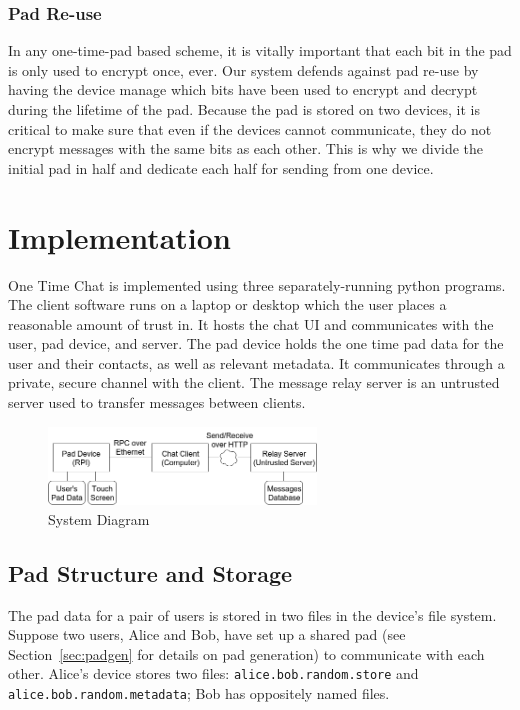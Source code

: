 \documentclass[twocolumn]{article}
\begin{document}
\subsubsection{Pad Re-use}
In any one-time-pad based scheme, it is vitally important that each bit in the pad is only used to encrypt once, ever.
Our system defends against pad re-use by having the device manage which bits have been used to encrypt and decrypt during the lifetime of the pad.
Because the pad is stored on two devices, it is critical to make sure that even if the devices cannot communicate, they do not encrypt messages with the same bits as each other. This is why we divide the initial pad in half and dedicate each half for sending from one device.


\section{Implementation}
One Time Chat is implemented using three separately-running python programs.
The client software runs on a laptop or desktop which the user places a reasonable amount of trust in. It hosts the chat UI and communicates with the user, pad device, and server.
The pad device holds the one time pad data for the user and their contacts, as well as relevant metadata. It communicates through a private, secure channel with the client.
The message relay server is an untrusted server used to transfer messages between clients.

\begin{figure}[htp]
\centering
\includegraphics[width=2.8in]{system-diagram}
\caption{System Diagram}
\end{figure}

\subsection{Pad Structure and Storage}
The pad data for a pair of users is stored in two files in the device's file system. Suppose two users, Alice and Bob, have set up a shared pad (see Section~\ref{sec:padgen} for details on pad generation) to communicate with each other. Alice's device stores two files: \texttt{alice.bob.random.store} and \texttt{alice.bob.random.metadata}; Bob has oppositely named files.
\end{document}
